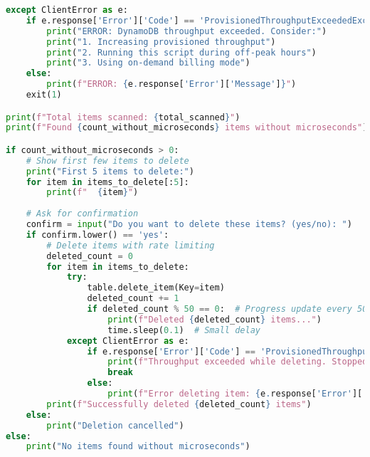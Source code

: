 \begin{lstlisting}[language=Python]
except ClientError as e:
    if e.response['Error']['Code'] == 'ProvisionedThroughputExceededException':
        print("ERROR: DynamoDB throughput exceeded. Consider:")
        print("1. Increasing provisioned throughput")
        print("2. Running this script during off-peak hours")
        print("3. Using on-demand billing mode")
    else:
        print(f"ERROR: {e.response['Error']['Message']}")
    exit(1)

print(f"Total items scanned: {total_scanned}")
print(f"Found {count_without_microseconds} items without microseconds")

if count_without_microseconds > 0:
    # Show first few items to delete
    print("First 5 items to delete:")
    for item in items_to_delete[:5]:
        print(f"  {item}")
    
    # Ask for confirmation
    confirm = input("Do you want to delete these items? (yes/no): ")
    if confirm.lower() == 'yes':
        # Delete items with rate limiting
        deleted_count = 0
        for item in items_to_delete:
            try:
                table.delete_item(Key=item)
                deleted_count += 1
                if deleted_count % 50 == 0:  # Progress update every 50 items
                    print(f"Deleted {deleted_count} items...")
                    time.sleep(0.1)  # Small delay
            except ClientError as e:
                if e.response['Error']['Code'] == 'ProvisionedThroughputExceededException':
                    print(f"Throughput exceeded while deleting. Stopped at {deleted_count} items.")
                    break
                else:
                    print(f"Error deleting item: {e.response['Error']['Message']}")
        print(f"Successfully deleted {deleted_count} items")
    else:
        print("Deletion cancelled")
else:
    print("No items found without microseconds")
\end{lstlisting}
